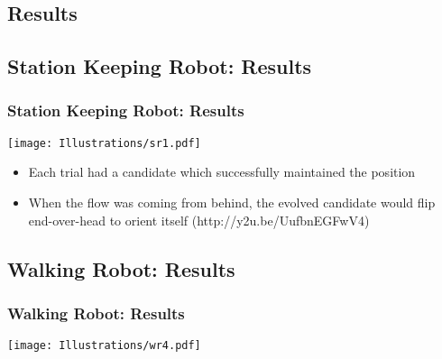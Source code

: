 \documentclass{beamer}
\begin{document}
\begin{frame}


\section{Results}
\subsection*{Station Keeping Robot: Results} %
\begin{frame}
  \frametitle{Station Keeping Robot: Results}
  \begin{center}
  \texttt{[image: Illustrations/sr1.pdf]}
       \\
    \end{center}
  \begin{itemize}
    \item Each trial had a candidate which successfully maintained the position
        \item When the flow was coming from behind, the evolved candidate would flip end-over-head to orient itself (http://y2u.be/UufbnEGFwV4)
  \end{itemize}
\end{frame}

\subsection*{Walking Robot: Results}
\begin{frame}
  \frametitle{Walking Robot: Results}

\begin{center}
 \texttt{[image: Illustrations/wr4.pdf]}
       \\
\end{center}
\end{frame}


\end{frame}
\end{document}
